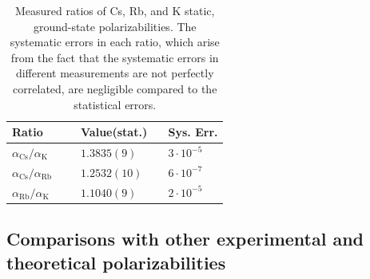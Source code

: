 \documentclass[twocolumn,pra,showpacs,superscriptaddress,longbibliography]{revtex4-1}   %
\newcommand{\sspace}{$\enspace$}
\newcommand{\ssspace}{$\quad$}
\newcommand{\ak}{\alpha_{\textrm{K}}}
\newcommand{\arb}{\alpha_{\textrm{Rb}}}
\newcommand{\acs}{\alpha_{\textrm{Cs}}}
\newcommand{\ratRbK}{1.1040(9)}
\newcommand{\ratCsK}{1.3835(9)}
\newcommand{\ratCsRb}{1.2532(10)}
\begin{document}
\begingroup
\begin{table}
\caption{\label{tableRatio}Measured ratios of Cs, Rb, and K static, ground-state polarizabilities. The systematic errors in each ratio, which arise from the fact that the systematic errors in different measurements are not perfectly correlated, are negligible compared to the statistical errors.}
\begin{center}
\begin{tabular}{lll}
\hline\hline
Ratio \ssspace \ssspace & Value(stat.) \sspace & Sys. Err. \\
\hline
$\acs/\ak$  & $\ratCsK$ & $3\cdot 10^{-5}$  \\
$\acs/\arb$ & $\ratCsRb$ & $6\cdot 10^{-7}$ \\
$\arb/\ak$  & $\ratRbK$ & $2\cdot 10^{-5}$ \\
\hline\hline
\end{tabular}
\end{center}
\end{table}
\endgroup

\subsection{Comparisons with other experimental and theoretical polarizabilities} \label{sectionComparisonsWithOtherExpTheory}
\end{document}

